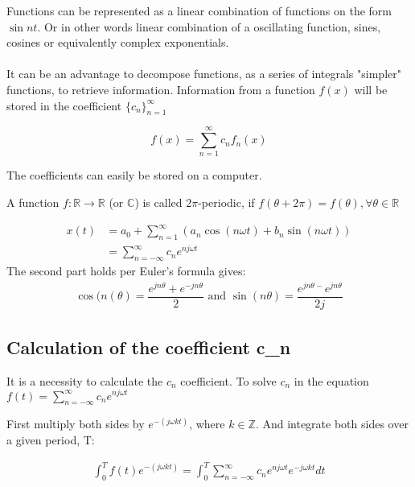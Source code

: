  

Functions can be represented as a linear combination of functions on the form $\sin nt$.
Or in other words linear combination of a oscillating function, sines, cosines or equivalently complex exponentials.
\\\\
It can be an advantage to decompose functions, as a series of integrals "simpler" functions, to retrieve information. Information from a function $f(x)$ will be stored in the coefficient $\{c_n\}_{n=1}^\infty$

\begin{equation}
f(x) = \sum_{n=1}^\infty c_n f_n(x)
\end{equation}

The coefficients can easily be stored on a computer.



A function $f: \mathbb{R}\to\mathbb{R}$ (or $\mathbb{C}$) is called $2\pi$-periodic, if $f(\theta + 2\pi) = f(\theta), \forall\theta\in\mathbb{R}$

%
%

\begin{align*}
	x(t) &= a_0 + \sum_{n=1}^\infty(a_n \cos(n \omega t) + b_n \sin(n \omega t))\\
	&= \sum_{n=-\infty}^{\infty} c_n e^{n j\omega t} 
\end{align*}
The second part holds per Euler's formula gives:
\begin{align*}
	\cos(n(\theta) = \dfrac{e^{j n \theta} + e^{-j n \theta}}{2} \text{ and } \sin(n \theta) = \dfrac{e^{jn\theta-}e^{jn\theta}}{2j}
\end{align*}

\subsection{Calculation of the coefficient c_n}
It is a necessity to calculate the $c_n$ coefficient.
To solve $c_n$ in the equation $f(t)= \sum_{n=-\infty}^{\infty} c_n e^{n j\omega t}$

First multiply both sides by $e^{-(j\omega k t)}$, where $k\in \mathbb{Z}$. And integrate both sides over a given period, T:

\begin{align*}
	\int_{0}^T f(t)e^{-(j\omega k t)} = \int_{0}^T \sum_{n=-\infty}^{\infty} c_n e^{n j\omega t} e^{-j\omega k t} dt
\end{align*}

%
